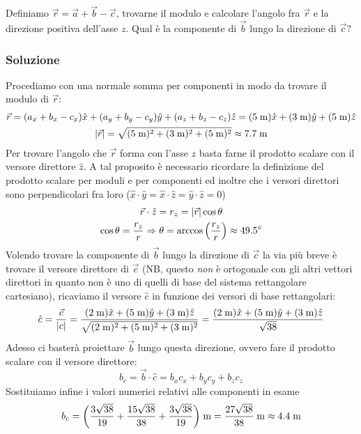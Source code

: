 \documentclass[12pt,a4paper]{book}
\begin{document}
Definiamo $\vec{r}=\vec{a}+\vec{b}-\vec{c}$, trovarne il modulo e calcolare l'angolo fra $\vec{r}$ e la direzione positiva dell'asse $z$. Qual è la componente di $\vec{b}$ lungo la direzione di $\vec{c}$?

\subsubsection*{Soluzione}
Procediamo con una normale somma per componenti in modo da trovare il modulo di $\vec{r}$:
%
\begin{gather*}
\vec{r}=(a_x+b_x-c_x)\hat{x}+(a_y+b_y-c_y)\hat{y}+(a_z+b_z-c_z)\hat{z}=(5\;\text{m})\hat{x}+(3\;\text{m})\hat{y}+(5\;\text{m})\hat{z}\\
\qty|\vec{r}|=\sqrt{(5\;\text{m})^2+(3\;\text{m})^2+(5\;\text{m})^2}\approx 7.7\;\text{m}
\end{gather*} 
%
Per trovare l'angolo che $\vec{r}$ forma con l'asse $z$ basta farne il prodotto scalare con il versore direttore $\hat{z}$. A tal proposito è necessario ricordare la definizione del prodotto scalare per moduli e per componenti ed inoltre che i versori direttori sono perpendicolari fra loro ($\hat{x}\cdot\hat{y}=\hat{x}\cdot\hat{z}=\hat{y}\cdot\hat{z}=0$)
%
\begin{gather*}
\vec{r}\cdot\hat{z}=r_z=\qty|\vec{r}|\cos\theta \\
\cos\theta=\frac{r_z}{r} \Rightarrow \theta=\arccos\qty(\frac{r_z}{r})\approx 49.5\degree
\end{gather*} 
%
Volendo trovare la componente di $\vec{b}$ lungo la direzione di $\vec{c}$   la via più breve è trovare il versore direttore di $\vec{c}$ (NB, questo \textit{non} è ortogonale con gli altri vettori direttori in quanto non è uno di quelli di base del sistema rettangolare cartesiano), ricaviamo il versore $\hat{c}$ in funzione dei versori di base rettangolari:
%
\begin{gather*}
\hat{c}=\frac{\vec{c}}{\qty|c|}=\frac{(2\;\text{m})\hat{x}+(5\;\text{m})\hat{y}+(3\;\text{m})\hat{z}}{\sqrt{(2\;\text{m})^2+(5\;\text{m})^2+(3\;\text{m})^2}}=\frac{(2\;\text{m})\hat{x}+(5\;\text{m})\hat{y}+(3\;\text{m})\hat{z}}{\sqrt{38}}
\end{gather*} 
%
Adesso ci basterà proiettare $\vec{b}$ lungo questa direzione, ovvero fare il prodotto scalare con il versore direttore: 
%
\begin{equation*}
b_c= \vec{b}\cdot\hat{c}=b_xc_x+b_yc_y+b_zc_z
\end{equation*} 
%
Sostituiamo infine i valori numerici relativi alle componenti in esame
%
\begin{equation*}
b_c=\qty(\frac{3\sqrt{38}}{19}+\frac{15\sqrt{38}}{38}+\frac{3\sqrt{38}}{19})\;\text{m}=\frac{27\sqrt{38}}{38}\;\text{m}\approx 4.4\;\text{m}
\end{equation*} 
%
\end{document}
